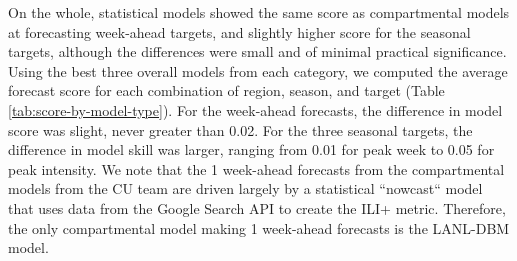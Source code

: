 \documentclass{article}\usepackage[]{graphicx}\usepackage[]{color}
\begin{document}
On the whole, statistical models showed the same score as compartmental models at forecasting week-ahead targets, and slightly higher score for the seasonal targets, although the differences were small and of minimal practical significance. 
Using the best three overall models from each category, we computed the average forecast score for each combination of region, season, and target (Table \ref{tab:score-by-model-type}). 
For the week-ahead forecasts, the difference in model score was slight, never greater than 
0.02. 
For the three seasonal targets, the difference in model skill was larger, ranging from 
0.01 
for 
peak week
to 
0.05 
for 
peak intensity.
We note that the 1 week-ahead forecasts from the compartmental models from the CU team are driven largely by a statistical ``nowcast`` model that uses data from the Google Search API to create the ILI+ metric.\cite{yang2014}
Therefore, the only compartmental model making 1 week-ahead forecasts is the LANL-DBM model. 




% 



\end{document}
